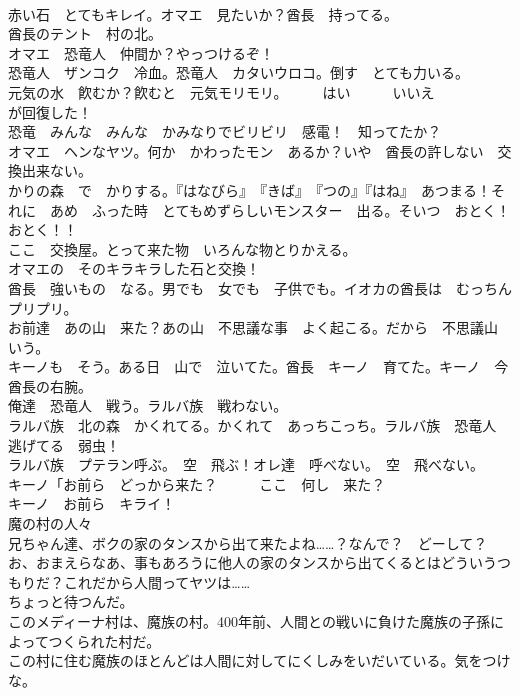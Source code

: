 \documentclass[8pt]{extreport}
\begin{document}
\begin{CJK}{UTF8}{min}
\\	赤い石　とてもキレイ。オマエ　見たいか？酋長　持ってる。	
\\	酋長のテント　村の北。	
\\	オマエ　恐竜人　仲間か？やっつけるぞ！	
\\	恐竜人　ザンコク　冷血。恐竜人　カタいウロコ。倒す　とても力いる。	
\\	元気の水　飮むか？飮むと　元気モリモリ。　　　はい　　　いいえ	
\\	が回復した！	
\\	恐竜　みんな　みんな　かみなりでビリビリ　感電！　知ってたか？	
\\	オマエ　ヘンなヤツ。何か　かわったモン　あるか？いや　酋長の許しない　交換出来ない。	
\\	かりの森　で　かりする。『はなびら』　『きば』　『つの』『はね』　あつまる！それに　あめ　ふった時　とてもめずらしいモンスター　出る。そいつ　おとく！　おとく！！	
\\	ここ　交換屋。とって来た物　いろんな物とりかえる。	
\\	オマエの　そのキラキラした石と交換！	
\\	酋長　強いもの　なる。男でも　女でも　子供でも。イオカの酋長は　むっちんプリプリ。	
\\	お前達　あの山　来た？あの山　不思議な事　よく起こる。だから　不思議山　いう。	
\\	キーノも　そう。ある日　山で　泣いてた。酋長　キーノ　育てた。キーノ　今　酋長の右腕。	
\\	俺達　恐竜人　戦う。ラルバ族　戦わない。	
\\	ラルバ族　北の森　かくれてる。かくれて　あっちこっち。ラルバ族　恐竜人　逃げてる　弱虫！	
\\	ラルバ族　プテラン呼ぶ。　空　飛ぶ！オレ達　呼べない。　空　飛べない。	
\\	キーノ「お前ら　どっから来た？　　　ここ　何し　来た？	
\\	キーノ　お前ら　キライ！	
\\	魔の村の人々	
\\	兄ちゃん達、ボクの家のタンスから出て来たよね……？なんで？　どーして？	
\\	お、おまえらなあ、事もあろうに他人の家のタンスから出てくるとはどういうつもりだ？これだから人間ってヤツは……	
\\	ちょっと待つんだ。	
\\	このメディーナ村は、魔族の村。400年前、人間との戦いに負けた魔族の子孫によってつくられた村だ。	
\\	この村に住む魔族のほとんどは人間に対してにくしみをいだいている。気をつけな。	

\end{CJK}
\end{document}
